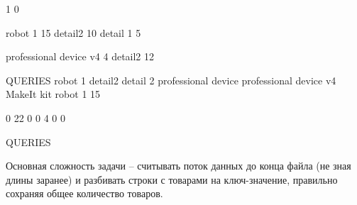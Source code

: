 \begin{myverbbox}[\small]{\voutput}
    1
    0
\end{myverbbox}


\begin{myverbbox}[\small]{\vinput}
    robot 1 15
    detail2 10
    detail 1 5
    
    professional device v4 4
    detail2 12
    
    QUERIES
    robot  1
    detail2
    detail 2
    professional device
    professional device v4
    MakeIt kit
    robot 1 15
\end{myverbbox}

\begin{myverbbox}[\small]{\voutput}
    0
    22
    0
    0
    4
    0
    0
\end{myverbbox}


\begin{myverbbox}[\small]{\vinput}
    QUERIES
\end{myverbbox}

\begin{myverbbox}[\small]{\voutput}
    
\end{myverbbox}

\solutionSection

Основная сложность задачи -- считывать поток данных до конца файла (не зная длины заранее) и разбивать строки с товарами на ключ-значение, правильно сохраняя общее количество товаров.

